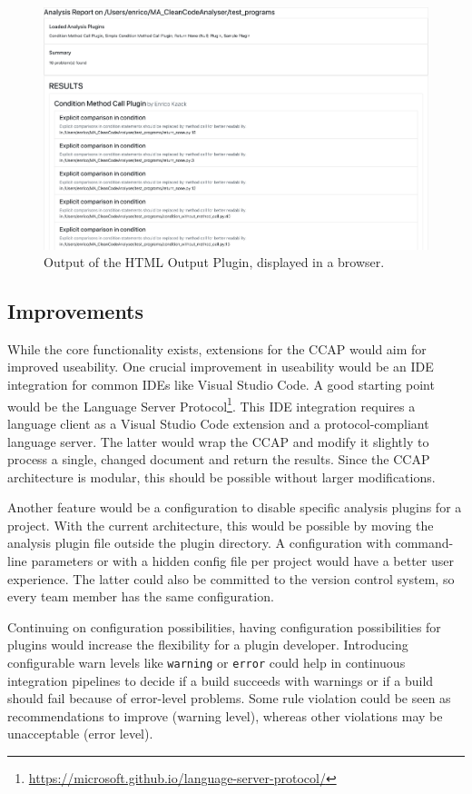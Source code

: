 \begin{figure}
    \includegraphics[width=1\textwidth]{img/CCAP/screenshot_html_output.png}
    \caption{Output of the HTML Output Plugin, displayed in a browser.}
    \label{fig:screen_html_output}
\end{figure}

\subsection{Improvements}
While the core functionality exists, extensions for the CCAP would aim for improved useability. One crucial improvement in useability would be an IDE integration for common IDEs like Visual Studio Code. A good starting point would be the Language Server Protocol\footnote{\url{https://microsoft.github.io/language-server-protocol/}}. This IDE integration requires a language client as a Visual Studio Code extension and a protocol-compliant language server. The latter would wrap the CCAP and modify it slightly to process a single, changed document and return the results. Since the CCAP architecture is modular, this should be possible without larger modifications. 

Another feature would be a configuration to disable specific analysis plugins for a project. With the current architecture, this would be possible by moving the analysis plugin file outside the plugin directory. A configuration with command-line parameters or with a hidden config file per project would have a better user experience. The latter could also be committed to the version control system, so every team member has the same configuration.

Continuing on configuration possibilities, having configuration possibilities for plugins would increase the flexibility for a plugin developer. Introducing configurable warn levels like \texttt{warning} or \texttt{error} could help in continuous integration pipelines to decide if a build succeeds with warnings or if a build should fail because of error-level problems. Some rule violation could be seen as recommendations to improve (warning level), whereas other violations may be unacceptable (error level).

